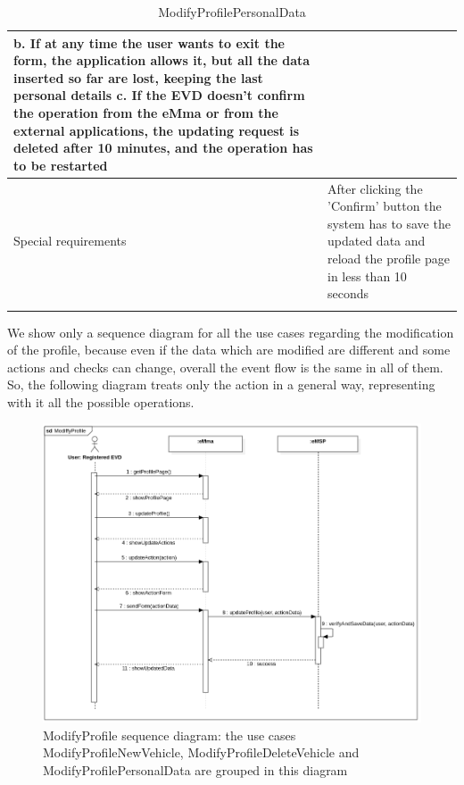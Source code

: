 \begin{center}
\begin{longtable}{p{4cm} p{11cm}}
        b. If at any time the user wants to exit the form, the application allows it, but all the data inserted so far are lost, keeping the last personal details \newline
        c. If the EVD doesn't confirm the operation from the eMma or from the external applications, the updating request is deleted after 10 minutes, and the operation has to be restarted \\
     \hline
     Special requirements & After clicking the 'Confirm' button the system has to save the updated data and reload the profile page in less than 10 seconds \\
     \hline
    \caption{ModifyProfilePersonalData}
    \label{tab:ModifyProfilePersonalData}
    \end{longtable}
\end{center}
We show only a sequence diagram for all the use cases regarding the modification of the profile, because even if the data which are modified are different and some actions and checks can change, overall the event flow is the same in all of them. So, the following diagram treats only the action in a general way, representing with it all the possible operations.
\begin{figure}[H]
    \centering
    \includegraphics[width=1\textwidth]{Images/cp3/ModifyProfileSD.png}
    \caption{ModifyProfile sequence diagram: the use cases ModifyProfileNewVehicle, ModifyProfileDeleteVehicle and ModifyProfilePersonalData are grouped in this diagram}
\end{figure}

